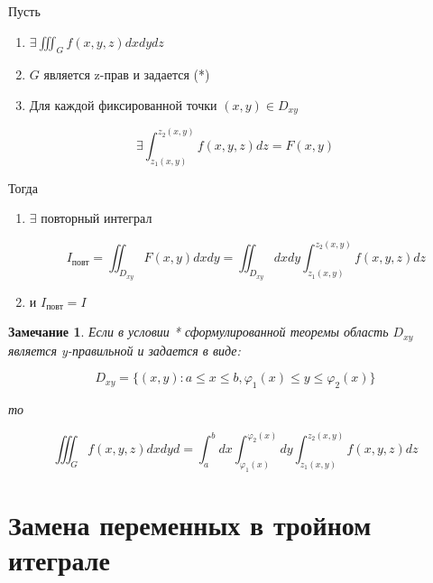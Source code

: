\documentclass[a4paper, 14pt]{report}
\newtheorem{note}{Замечание}[chapter]
\begin{document}
    \begin{theorem}
        Пусть

        \begin{enumerate}
            \item $\exists \iiint_G f(x,y,z) dxdydz$
            \item $G$ является z-прав и задается (*)
            \item Для каждой фиксированной точки $(x,y) \in D_{xy}$
        \end{enumerate}

        $$
        \exists \int_{z_1(x,y)}^{z_2(x,y)} f(x,y,z) dz = F(x,y)
        $$

        Тогда 

        \begin{enumerate}
            \item $\exists$ повторный интеграл

                $$
                I_\text{повт} = \iint_{D_{xy}} F(x,y) dxdy = \iint_{D_{xy}} dxdy \int_{z_1(x,y)}^{z_2(x,y)} f(x,y,z) dz
                $$

            \item и $I_\text{повт} = I$
        \end{enumerate}
    \end{theorem}

    \begin{note}
        Если в условии * сформулированной теоремы область $D_{xy}$ является y-правильной и задается в виде:

        $$
        D_{xy} = \{ (x,y): a \le x \le b, \varphi_1(x) \le y \le \varphi_2(x) \}
        $$

        то

        $$
        \iiint_G f(x,y,z) dxdyd = \int_a^bdx \int_{\varphi_1(x)}^{\varphi_2(x)} dy \int_{z_1(x,y)}^{z_2(x,y)} f(x,y,z) dz
        $$
    \end{note}

    \section{Замена переменных в тройном итеграле}
\end{document}
